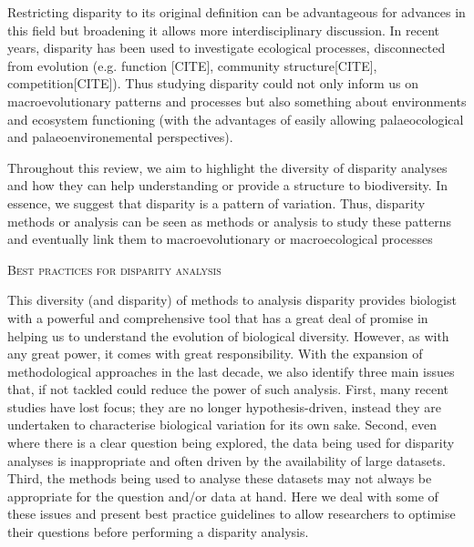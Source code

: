 \documentclass[12pt,letterpaper]{article}
\renewcommand{\section}[1]{%
\bigskip
\begin{center}
\begin{Large}
\normalfont\scshape #1
\medskip
\end{Large}
\end{center}}
\begin{document}
Restricting disparity to its original definition can be advantageous for advances in this field but broadening it allows more interdisciplinary discussion.
In recent years, disparity has been used to investigate ecological processes, disconnected from evolution (e.g. function [CITE], community structure[CITE], competition[CITE]).
Thus studying disparity could not only inform us on macroevolutionary patterns and processes but also something about environments and ecosystem functioning (with the advantages of easily allowing palaeocological and palaeoenvironemental perspectives).

Throughout this review, we aim to highlight the diversity of disparity analyses and how they can help understanding or provide a structure to biodiversity.
In essence, we suggest that disparity is a pattern of variation.
Thus, disparity methods or analysis can be seen as methods or analysis to study these patterns and eventually link them to macroevolutionary or macroecological processes

\section{Best practices for disparity analysis}

This diversity (and disparity) of methods to analysis disparity provides biologist with a powerful and comprehensive tool %
that has a great deal of promise in helping us to understand the evolution of biological diversity.
However, as with any great power, it comes with great responsibility. 
With the expansion of methodological approaches in the last decade, we also identify three main issues that, if not tackled could reduce the power of such analysis.
First, many recent studies have lost focus; they are no longer hypothesis-driven, instead they are undertaken to characterise biological variation for its own sake.
Second, even where there is a clear question being explored, the data being used for disparity analyses is inappropriate and often driven by the availability of large datasets.
Third, the methods being used to analyse these datasets may not always be appropriate for the question and/or data at hand.
Here we deal with some of these issues and present best practice guidelines to allow researchers to optimise their questions before performing a disparity analysis.
\end{document}
